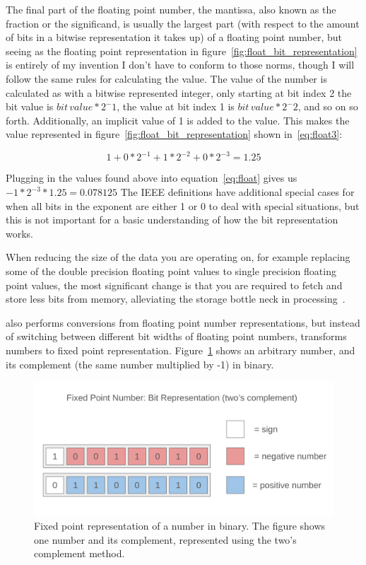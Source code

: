 The final part of the floating point number, the mantissa, also known as the fraction or the significand, is usually the largest part (with respect to the amount of bits in a bitwise representation it takes up) of a floating point number, but seeing as the floating point representation in figure~\ref{fig:float_bit_representation} is entirely of my invention I don't have to conform to those norms, though I will follow the same rules for calculating the value.
The value of the number is calculated as with a bitwise represented integer, only starting at bit index 2 the bit value is $bit\,value*2^-1$, the value at bit index 1 is $bit\,value*2^-2$, and so on so forth. Additionally, an implicit value of 1 is added to the value. This makes the value represented in figure~\ref{fig:float_bit_representation} shown in~\ref{eq:float3}:

\begin{equation}\label{eq:float3}
   1 + 0*2^{-1} + 1*2^{-2} + 0*2^{-3} = 1.25
\end{equation}

Plugging in the values found above into equation~\ref{eq:float} gives us $-1 * 2^{-3} * 1.25 = 0.078125$
The IEEE definitions have additional special cases for when all bits in the exponent are either 1 or 0 to deal with special situations, but this is not important for a basic understanding of how the bit representation works.

When reducing the size of the data you are operating on, for example replacing some of the double precision floating point values to single precision floating point values, the most significant change is that you are required to fetch and store less bits from memory, alleviating the storage bottle neck in processing~\cite{floatsmith_paper}.

\taffo also performs conversions from floating point number representations, but instead of switching between different bit widths of floating point numbers, \taffo transforms numbers to fixed point representation. Figure~\ref{fig:fixed_point_representation} shows an arbitrary number, and its complement (the same number multiplied by -1) in binary.

\begin{figure}
    \centering
    \includegraphics[width=0.5\linewidth]{Images/fixed_point_bit_representation.png}
    \caption{Fixed point representation of a number in binary. The figure shows one number and its complement, represented using the two's complement method.}
    \label{fig:fixed_point_representation}
\end{figure}

